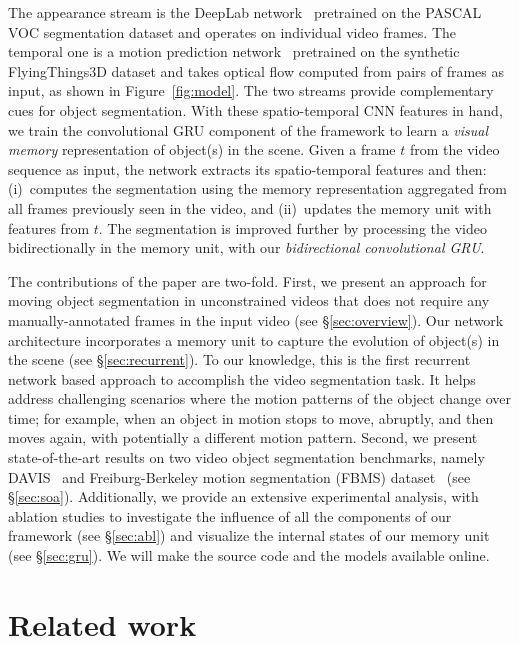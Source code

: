 \documentclass[10pt,twocolumn,letterpaper]{article}
\begin{document}
The appearance stream is the DeepLab network~\cite{chen2014semantic} pretrained
on the PASCAL VOC segmentation dataset and operates on individual video frames.
The temporal one is a motion prediction network~\cite{tokmakov2016learning}
pretrained on the synthetic FlyingThings3D dataset and takes optical flow
computed from pairs of frames as input, as shown in Figure~\ref{fig:model}. The
two streams provide complementary cues for object segmentation. With these
spatio-temporal CNN features in hand, we train the convolutional GRU component
of the framework to learn a {\it visual memory} representation of object(s) in
the scene. Given a frame $t$ from the video sequence as input, the network
extracts its spatio-temporal features and then: (i)~computes the segmentation
using the memory representation aggregated from all frames previously seen in
the video, and (ii)~updates the memory unit with features from $t$. The
segmentation is improved further by processing the video bidirectionally in the
memory unit, with our {\it bidirectional convolutional GRU}.

The contributions of the paper are two-fold. First, we present an approach for
moving object segmentation in unconstrained videos that does not require any
manually-annotated frames in the input video (see \S\ref{sec:overview}).  Our
network architecture incorporates a memory unit to capture the evolution of
object(s) in the scene (see \S\ref{sec:recurrent}). To our knowledge, this is
the first recurrent network based approach to accomplish the video segmentation
task. It helps address challenging scenarios where the motion patterns of the
object change over time; for example, when an object in motion stops to move,
abruptly, and then moves again, with potentially a different motion pattern.
Second, we present state-of-the-art results on two video object segmentation
benchmarks, namely DAVIS~\cite{Perazzi16} and Freiburg-Berkeley motion
segmentation (FBMS) dataset~\cite{ochs2014segmentation} (see \S\ref{sec:soa}).
Additionally, we provide an extensive experimental analysis, with ablation
studies to investigate the influence of all the components of our framework
(see \S\ref{sec:abl}) and visualize the internal states of our memory unit (see
\S\ref{sec:gru}). We will make the source code and the models available online.  

\section{Related work}
\label{sec:rel}
\end{document}
